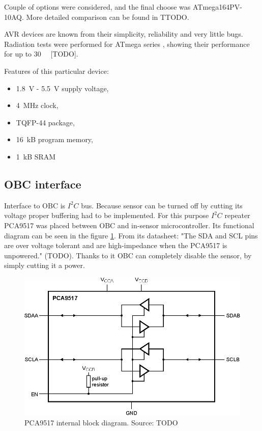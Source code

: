         Couple of options were considered, and the final choose was ATmega164PV-10AQ. More detailed comparison can be found in TTODO.

        AVR devices are known from their simplicity, reliability and very little bugs. Radiation tests were performed for ATmega series , showing their performance for up to \SI{30}{\kilo\rad} [TODO].

        Features of this particular device:
        \begin{itemize}
            \item \SI{1.8}{\volt} - \SI{5.5}{\volt} supply voltage,
            \item \SI{4}{\mega\hertz} clock,
            \item TQFP-44 package,
            \item \SI{16}{\kilo B} program memory,
            \item \SI{1}{\kilo B} SRAM
        \end{itemize}

    \subsection{OBC interface}
        Interface to OBC is $I^2C$ bus. Because sensor can be turned off by cutting its voltage proper buffering had to be implemented. For this purpose $I^2C$ repeater PCA9517 was placed between OBC and in-sensor microcontroller. Its functional diagram can be seen in the figure \ref{PCA9517}. From its datasheet: "The SDA and SCL pins are over voltage tolerant and are high-impedance when the PCA9517 is unpowered." (TODO). Thanks to it OBC can completely disable the sensor, by simply cutting it a power.

        \begin{figure}[H]
            \centering
            \includegraphics[width=0.7\paperwidth]{img/06/PCA9517.eps}
            \caption{PCA9517 internal block diagram. Source: TODO}
            \label{PCA9517}
        \end{figure}


